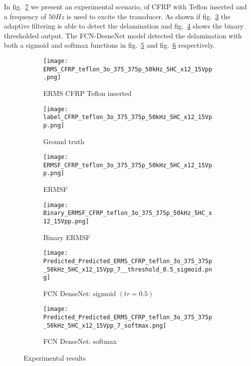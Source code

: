 	In fig.~\ref{fig:Exp_ERMS_teflon} we present an experimental scenario, of CFRP with Teflon inserted and a frequency of \(50 Hz\) is used to excite the transducer.
	As shown if fig.~\ref{fig:ERMSF_CFRP_teflon} the adaptive filtering is able to detect the delamination and fig.~\ref{fig:Binary_ERMSF_CFRP} shows the binary thresholded output. 
	The FCN-DesneNet model detected the delamination with both a sigmoid and softmax functions in fig.~\ref{fig:EXP_predict_sigmoid} and fig.~\ref{fig:EXP_predict_softmax} respectively.
	\begin{figure} [h!]
		\centering
		\begin{subfigure}[b]{0.47\textwidth}
			\centering
			\texttt{[image: ERMS\_CFRP\_teflon\_3o\_375\_375p\_50kHz\_5HC\_x12\_15Vpp.png]}
			\caption{ERMS CFRP Teflon inserted}
			\label{fig:Delamination}
		\end{subfigure}			
		\hfill
		\begin{subfigure}[b]{0.47\textwidth}
			\centering 	
			\texttt{[image: label\_CFRP\_teflon\_3o\_375\_375p\_50kHz\_5HC\_x12\_15Vpp.png]}
			\caption{Ground truth} 
			\label{fig:damage_label}
		\end{subfigure}
		\hfill
		\begin{subfigure}[b]{0.47\textwidth}
			\centering
			\texttt{[image: ERMSF\_CFRP\_teflon\_3o\_375\_375p\_50kHz\_5HC\_x12\_15Vpp.png]}
			\caption{ERMSF} 
			\label{fig:ERMSF_CFRP_teflon}
		\end{subfigure}
		\hfill
		\begin{subfigure}[b]{0.47\textwidth}
		\centering
		\texttt{[image: Binary\_ERMSF\_CFRP\_teflon\_3o\_375\_375p\_50kHz\_5HC\_x12\_15Vpp.png]}
		\caption{Binary ERMSF} 
		\label{fig:Binary_ERMSF_CFRP}
		\end{subfigure}
		\hfill
		\begin{subfigure}[b]{0.47\textwidth}
			\centering
			\texttt{[image: Predicted\_Predicted\_ERMS\_CFRP\_teflon\_3o\_375\_375p\_50kHz\_5HC\_x12\_15Vpp\_7\_\_threshold\_0.5\_sigmoid.png]}
			\caption{FCN DenseNet: sigmoid \((tr = 0.5)\)} 
			\label{fig:EXP_predict_sigmoid}
		\end{subfigure}
		\hfill
		\begin{subfigure}[b]{0.47\textwidth}
			\centering
			\texttt{[image: Predicted\_Predicted\_ERMS\_CFRP\_teflon\_3o\_375\_375p\_50kHz\_5HC\_x12\_15Vpp\_7\_softmax.png]}
			\caption{FCN DenseNet: softmax} 
			\label{fig:EXP_predict_softmax}
		\end{subfigure}
			\caption{Experimental results}
			\label{fig:Exp_ERMS_teflon}
		\end{figure}
	
